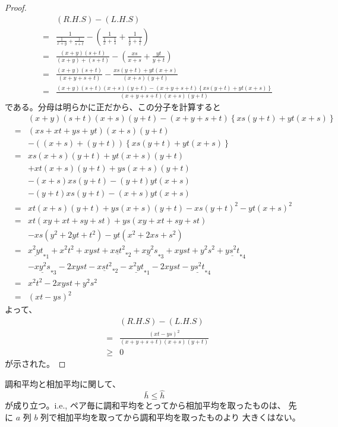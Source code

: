 \documentclass[12pt]{jsarticle}
\def\arithmean#1{\bar{#1}}
\def\harmmean#1{\hat{#1}}
\def\harmformula#1#2#3{\frac{#1}{\frac{1}{#2} + \frac{1}{#3}}}
\begin{document}
\begin{proof}
\begin{eqnarray}
&& (R.H.S) - (L.H.S) \nonumber \\
&=& \harmformula{1}{x + y}{s + t} -
\left( \harmformula{1}{x}{s} + \harmformula{1}{y}{t} \right) \\
&=& \frac{(x + y)(s + t)}{(x + y) + (s + t)}
- \left( \frac{x s}{x + s} + \frac{y t}{y + t} \right) \\
&=& \frac{(x + y)(s + t)}{(x + y + s + t)}
- \frac{x s (y + t) + y t (x + s)}{(x + s)(y + t)} \\
&=& \frac{(x+y)(s+t)(x+s)(y+t) - (x+y+s+t)
\left\{ xs(y+t) + yt(x+s) \right\} }
{ (x + y + s + t)(x + s)(y + t) }
\end{eqnarray}
である。分母は明らかに正だから、この分子を計算すると
\begin{eqnarray}
&& (x+y)(s+t)(x+s)(y+t) - (x+y+s+t)\left\{ xs(y+t) + yt(x+s) \right\}
\nonumber \\
&=& (xs + xt + ys + yt)(x + s)(y + t) \nonumber \\
&& - ((x + s) + (y + t)) \left\{ xs(y + t) + yt(x + s) \right\} \\
&=& xs(x + s)(y + t) + yt(x + s)(y + t) \nonumber \\
&& + xt(x + s)(y + t) + ys(x + s)(y +t) \nonumber \\
&& - (x + s)xs(y + t) - (y + t)yt(x + s) \nonumber \\
&& - (y + t)xs(y + t) - (x + s)yt(x + s) \\
&=& x t (x + s)(y + t) + y s (x + s)(y + t) - xs(y+t)^2 - yt(x+s)^2 \\
&=& xt(xy + xt + sy + st) + ys(xy + xt + sy + st) \nonumber \\
&& - xs(y^2 + 2yt + t^2) - yt(x^2 + 2xs +s^2) \\
&=& \underline{x^2yt}_{*1} + x^2t^2 + xyst + \underline{xst^2}_{*2}
+ \underline{xy^2s}_{*3} + xyst + y^2s^2 + \underline{ys^2t}_{*4} \nonumber \\
&& - \underline{xy^2s}_{*3} - 2xyst - \underline{xst^2}_{*2}
- \underline{x^2yt}_{*1} - 2xyst - \underline{ys^2t}_{*4} \\
&=& x^2t^2 - 2 xyst + y^2s^2 \\
&=& (xt - ys)^2
\end{eqnarray}
よって、
\begin{eqnarray}
&& (R.H.S) - (L.H.S) \nonumber \\
&=& \frac{(xt - ys)^2}{ (x + y + s + t)(x + s)(y +t) } \\
&\ge& 0
\end{eqnarray}
が示された。
\end{proof}

\begin{corollary}
調和平均と相加平均に関して、
\begin{equation}
\arithmean{h} \le \harmmean{h}
\end{equation}
が成り立つ。i.e.,
ペア毎に調和平均をとってから相加平均を取ったものは、
先に $a$ 列 $b$ 列で相加平均を取ってから調和平均を取ったものより
大きくはない。
\end{corollary}
\end{document}
